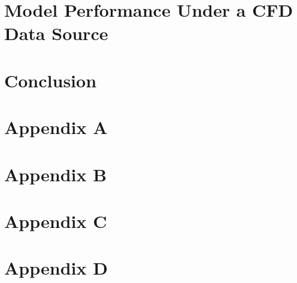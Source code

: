 \documentclass[12pt]{report}
\begin{document}
\chapter{Model Performance Under a CFD Data Source}
\label{chap:fw}


\chapter{Conclusion}
\label{chap:conc}


% 


\chapter{Appendix A}
\label{chap:app_ml}


\chapter{Appendix B}
\label{chap:app_b}


\chapter{Appendix C}
\label{chap:app_c}


\chapter{Appendix D}
\label{chap:app_d}


\printindex


\end{document}
